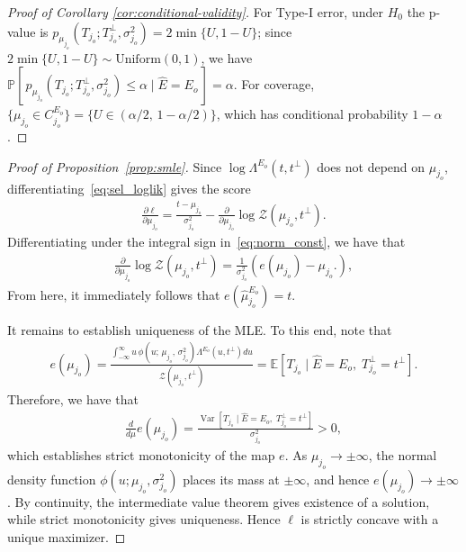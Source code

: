 \documentclass[12pt]{article}
\newcommand{\nbracket}[1]{\left( #1 \right)}
\newcommand{\rbracket}[1]{\left[ #1 \right]}
\newcommand{\Var}{\operatorname{Var}}
\newcommand{\Pp}{{\mathbb{P}}}
\newcommand{\Ee}{{\mathbb{E}}}
\newcommand{\Ehat}{\widehat{E}}
\begin{document}
\begin{appendices}
\begin{proof}[Proof of Corollary \ref{cor:conditional-validity}]
For Type-I error, under $H_0$ the p-value is $p_{\mu_{j_o}}(T_{j_o};T_{j_o}^\perp,\sigma_{j_o}^2) = 2\min\{U, 1-U\}$; since $2\min\{U,1-U\} \sim
\mathrm{Uniform}(0,1)$, we have $\Pp[\,p_{\mu_{j_o}}(T_{j_o};T_{j_o}^\perp,\sigma_{j_o}^2) \le \alpha \mid \Ehat = E_o\,] =\alpha$.
For coverage,
$\{\mu_{j_o} \in C^{E_o}_{j_o}\} = \{U \in (\alpha/2,\, 1-\alpha/2)\}$, which
has conditional probability $1-\alpha$. 
\end{proof}

\begin{proof}[Proof of Proposition~\ref{prop:smle}]
Since $\log\Lambda^{E_o}(t, t^\perp)$ does not depend on
$\mu_{j_o}$, differentiating~\eqref{eq:sel_loglik} gives the score
\begin{align*}
  \frac{\partial \ell}{\partial \mu_{j_o}}
  = \frac{t - \mu_{j_o}}{\sigma_{j_o}^2}
  - \frac{\partial}{\partial \mu_{j_o}}
    \log \mathcal{Z}(\mu_{j_o}, t^\perp).
\end{align*}
Differentiating under the integral sign in~\eqref{eq:norm_const}, we have that
\begin{align*}
  \frac{\partial}{\partial \mu_{j_o}}
  \log \mathcal{Z}(\mu_{j_o}, t^\perp)
  =
  \frac{1}{\sigma_{j_o}^2}
  \nbracket{e(\mu_{j_o})- \mu_{j_o}.
  },
\end{align*}
From here, it immediately follows that $e(\widehat{\mu}_{j_o}^{E_o}) = t$.

It remains to establish uniqueness of the MLE.
To this end, note that 
\begin{align*}
  e(\mu_{j_o})=
  \frac{
    \int_{-\infty}^{\infty}
    u\, \phi\nbracket{u;\, \mu_{j_o},\, \sigma_{j_o}^2}
    \Lambda^{E_o}\nbracket{u, t^\perp} du
  }{
    \mathcal{Z}(\mu_{j_o}, t^\perp)
  }  =
  \Ee\rbracket{T_{j_o} \mid \Ehat = E_o,\; T_{j_o}^\perp = t^\perp}.
\end{align*}
Therefore, we have that
\begin{align*}
  \frac{d}{d\mu} e(\mu_{j_o})
  =
  \frac{
    \Var\rbracket{T_{j_o} \mid \Ehat = E_o,\; T_{j_o}^\perp = t^\perp}
  }{
    \sigma_{j_o}^2
  }
  > 0,
\end{align*}
which establishes strict monotonicity of the map $e$. 
As $\mu_{j_o} \to \pm\infty$, the normal density function $\phi(u;\mu_{j_o},\sigma_{j_o}^2)$ places its mass at $\pm\infty$, and hence $e(\mu_{j_o})\to\pm\infty$. 
By continuity, the intermediate value theorem gives existence of a solution, while strict monotonicity gives uniqueness. Hence $\ell$ is strictly concave with a unique maximizer.
\end{proof}




\end{appendices}
\end{document}
